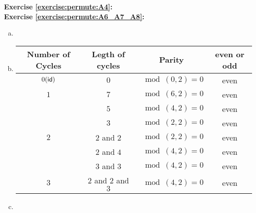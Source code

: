 \noindent\textbf{Exercise  \ref{exercise:permute:A4}:}\\

\noindent\textbf{Exercise  \ref{exercise:permute:A6_A7_A8}:} %
\begin{enumerate}[(a)]
\item

\item
\begin{center}
\begin{tabular}{|c|c|c|c|}
\hline
Number of Cycles & Legth of cycles & Parity & even or odd \\
\hline
$0(\sf{id})$ & $0$ & $\mod(0,2)=0$ & even\\
\hline
$1$ & $7$ & $\mod(6,2)=0$ & even\\
& $5$ & $\mod(4,2)=0$ & even\\
& $3$ & $\mod(2,2)=0$ & even\\
\hline
$2$ & $2$ and $2$ & $\mod(2,2)=0$ & even\\  
& $2$ and $4$ & $\mod(4,2)=0$ & even\\
& $3$ and $3$ & $\mod(4,2)=0$ & even\\
\hline
$3$ & $2$ and $2$ and $3$ & $\mod(4,2)=0$ & even\\
\hline
\end{tabular}
\end{center}

\item
\end{enumerate}